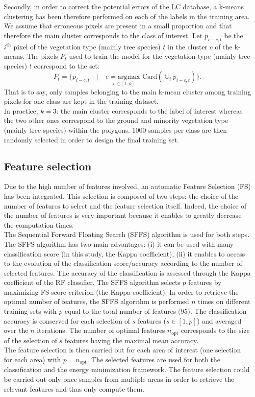 Secondly, in order to correct the potential errors of the LC database, a k-means clustering has been therefore performed on each of the labels in the training area. We assume that erroneous pixels are present in a small proportion and that therefore the main cluster corresponds to the class of interest. Let $p_{i-c,t}$ be the $i^{\text{th}}$ pixel of the vegetation type (mainly tree species) $t$ in the cluster $c$ of the k-means. The pixels $P_{t}$ used to train the model for the vegetation type (mainly tree species) $t$ correspond to the set:
\begin{equation}
P_{t} = \{{p_{i-c,t} \quad | \quad \underset{c \in [1,k]}{c=\text{argmax }}\text{Card} ( \cup_{i} p_{i-c,t} ) } \}.
\end{equation}
That is to say, only samples belonging to the main k-mean cluster among training pixels for one class are kept in the training dataset. \\
In practice, $k=3$: the main cluster corresponds to the label of interest whereas the two other ones correspond to the ground and minority vegetation type (mainly tree species) within the polygons. 1000 samples per class are then randomly selected in order to design the final training set.

\subsection{Feature selection}
Due to the high number of features involved, an automatic Feature Selection (FS) has been integrated. This selection is composed of two steps: the choice of the number of features to select and the feature selection itself. Indeed, the choice of the number of features is very important because it enables to greatly decrease the computation times. \\
The Sequential Forward Floating Search (SFFS) \citep{pudil1994floating} algorithm is used for both steps. The SFFS algorithm has two main advantages: (i) it can be used with many classification score (in this study, the Kappa coefficient), (ii) it enables to access to the evolution of the classification score/accuracy according to the number of selected features. The accuracy of the classification is assessed through the Kappa coefficient of the RF classifier. The SFFS algorithm selects $p$ features by maximizing FS score criterion (the Kappa coefficient). In order to retrieve the optimal number of features, the SFFS algorithm is performed $n$ times on different training sets with $p$ equal to the total number of features (95). The classification accuracy is conserved for each selection of $s$ features ($s \in [1, p]$) and averaged over the $n$ iterations. The number of optimal features $n_{\text{opt}}$ corresponds to the size of the selection of $s$ features having the maximal mean accuracy. \\
The feature selection is then carried out for each area of interest (one selection for each area) with $p=n_{\text{opt}}$. The selected features are used for both the classification and the energy minimization framework. The feature selection could be carried out only once samples from multiple areas in order to retrieve the relevant features and thus only compute them.

